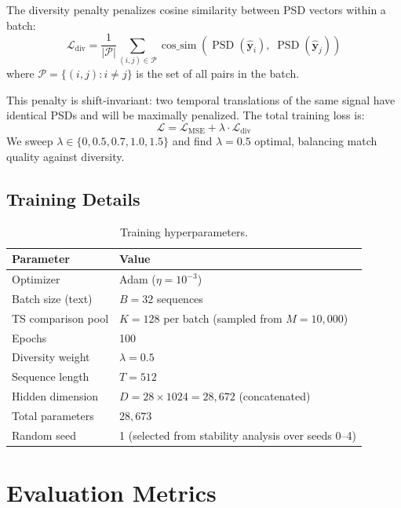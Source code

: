 \documentclass[11pt,a4paper]{article}
\newcommand{\byhat}{\hat{\mathbf{y}}}
\DeclareMathOperator{\PSD}{PSD}
\DeclareMathOperator{\cossim}{cos\_sim}
\begin{document}
The diversity penalty penalizes cosine similarity between PSD vectors within a batch:
\begin{equation}\label{eq:div-penalty}
    \mathcal{L}_{\text{div}} = \frac{1}{|\mathcal{P}|}\sum_{(i,j) \in \mathcal{P}} \cossim\!\left(\PSD(\byhat_i),\; \PSD(\byhat_j)\right)
\end{equation}
where $\mathcal{P} = \{(i,j) : i \neq j\}$ is the set of all pairs in the batch.

This penalty is shift-invariant: two temporal translations of the same signal have identical PSDs and will be maximally penalized.
The total training loss is:
\begin{equation}\label{eq:total-loss}
    \mathcal{L} = \mathcal{L}_{\text{MSE}} + \lambda \cdot \mathcal{L}_{\text{div}}
\end{equation}
We sweep $\lambda \in \{0, 0.5, 0.7, 1.0, 1.5\}$ and find $\lambda = 0.5$ optimal, balancing match quality against diversity.

\subsection{Training Details}

\begin{table}[h]
\centering
\small
\begin{tabular}{ll}
\toprule
Parameter & Value \\
\midrule
Optimizer & Adam ($\eta = 10^{-3}$) \\
Batch size (text) & $B = 32$ sequences \\
TS comparison pool & $K = 128$ per batch (sampled from $M = 10{,}000$) \\
Epochs & 100 \\
Diversity weight & $\lambda = 0.5$ \\
Sequence length & $T = 512$ \\
Hidden dimension & $D = 28 \times 1024 = 28{,}672$ (concatenated) \\
Total parameters & $28{,}673$ \\
Random seed & 1 (selected from stability analysis over seeds 0--4) \\
\bottomrule
\end{tabular}
\caption{Training hyperparameters.}
\label{tab:hyperparams}
\end{table}

\section{Evaluation Metrics}
\end{document}
